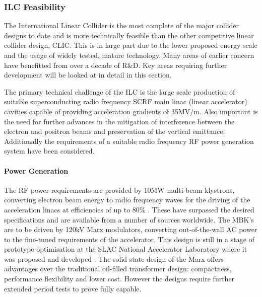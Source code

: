 \subsubsection{ILC Feasibility}

The International Linear Collider is the most complete of the major collider designs to date and is more technically feasible than the other competitive linear collider design, CLIC. This is in large part due to the lower proposed energy scale and the usage of widely tested, mature technology. Many areas of earlier concern have benefitted from over a decade of R\&D. Key areas requiring further development will be looked at in detail in this section.

The primary technical challenge of the ILC is the large scale production of suitable superconducting radio frequency SCRF main linac (linear accelerator) cavities capable of providing acceleration gradients of 35MV/m. Also important is the need for further advances in the mitigation of interference between the electron and positron beams and preservation of the vertical emittance. Additionally the requirements of a suitable radio frequency RF power generation system have been considered.

\paragraph{Power Generation}

The RF power requirements are provided by 10MW multi-beam klystrons, converting electron beam energy to radio frequency waves for the driving of the acceleration linacs at efficiencies of up to 80\% \cite{LINAC:Klystron}. These have surpassed the desired specifications and are available from a number of sources worldwide. The MBK’s are to be driven by 120kV Marx modulators, converting out-of-the-wall AC power to the fine-tuned requirements of the accelerator. This design is still in a stage of prototype optimisation at the SLAC National Accelerator Laboratory where it was proposed and developed \cite{LINAC:Marx}. The solid-state design of the Marx offers advantages over the traditional oil-filled transformer design: compactness, performance flexibility and lower cost. However the designs require further extended period tests to prove fully capable.

